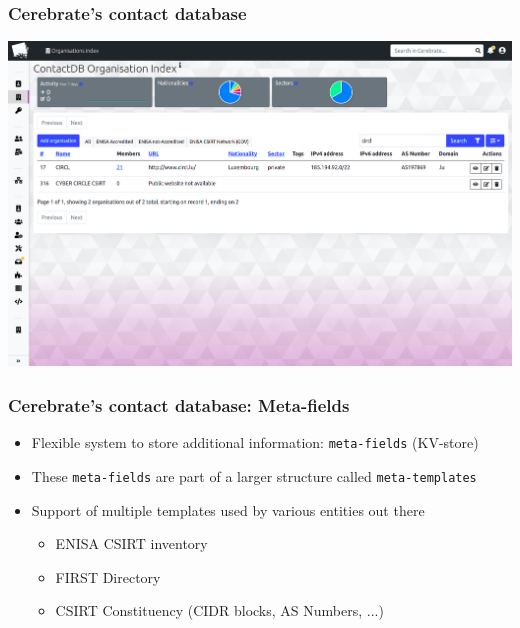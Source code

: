 \begin{frame}
\frametitle{Cerebrate's contact database}
    \begin{center}
        \includegraphics[width=0.99\linewidth]{pictures/contact-database-2.png}
    \end{center}
\end{frame}

\begin{frame}
\frametitle{Cerebrate's contact database: Meta-fields}
    \begin{itemize}
        \item Flexible system to store additional information: \texttt{meta-fields} (KV-store)
        \item These \texttt{meta-fields} are part of a larger structure called \texttt{meta-templates}
        \item Support of multiple templates used by various entities out there
        \begin{itemize}
            \item ENISA CSIRT inventory
            \item FIRST Directory
            \item CSIRT Constituency (CIDR blocks, AS Numbers, ...)
        \end{itemize}
    \end{itemize}
\end{frame}

